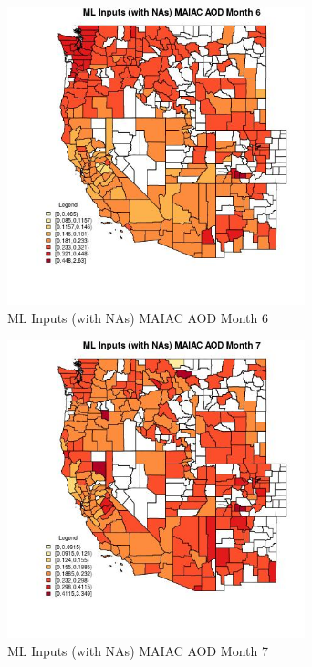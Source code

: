 \begin{figure} 
\centering  
\includegraphics[width=0.77\textwidth]{Code_Outputs/Report_ML_input_PM25_Step4_part_f_de_duplicated_aveswNAs_CountyMAIAC_AODmedianMonth6.jpg} 
\caption{\label{fig:Report_ML_input_PM25_Step4_part_f_de_duplicated_aveswNAsCountyMAIAC_AODmedianMonth6}ML Inputs (with NAs) MAIAC AOD Month 6} 
\end{figure} 
 

\begin{figure} 
\centering  
\includegraphics[width=0.77\textwidth]{Code_Outputs/Report_ML_input_PM25_Step4_part_f_de_duplicated_aveswNAs_CountyMAIAC_AODmedianMonth7.jpg} 
\caption{\label{fig:Report_ML_input_PM25_Step4_part_f_de_duplicated_aveswNAsCountyMAIAC_AODmedianMonth7}ML Inputs (with NAs) MAIAC AOD Month 7} 
\end{figure} 
 

